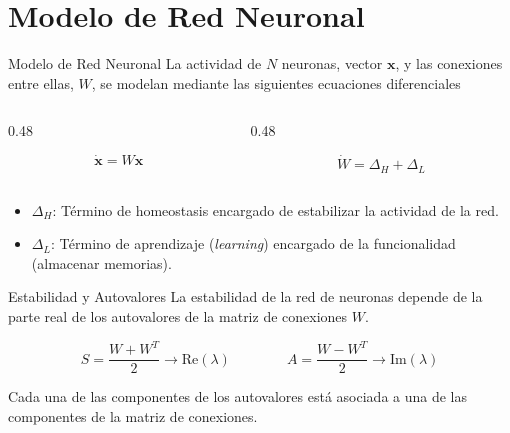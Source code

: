 \documentclass[10pt]{beamer}
\begin{document}
\section{Modelo de Red Neuronal}
\begin{frame}{Modelo de Red Neuronal}
    La actividad de \(N\) neuronas, vector \(\mathbf{x}\), y las conexiones entre ellas, \(W\), se modelan mediante las siguientes ecuaciones diferenciales 
    \vfill
    \begin{columns}[c]
        \begin{column}{0.48\textwidth}
            \begin{eqbox}
                \begin{equation}
                    \dot{\mathbf{x}} = W\mathbf{x}
                \end{equation}           
            \end{eqbox}

        \end{column}
        \begin{column}{0.48\textwidth}
            \begin{eqbox}
                \begin{equation}
                    \dot{W} = \Delta_H + \Delta_L
                \end{equation}        
            \end{eqbox}
        \end{column}
    \end{columns}
    \vfill
    \begin{itemize}
        \item \(\Delta_H\): Término de homeostasis encargado de estabilizar la actividad de la red.
        \item \(\Delta_L\): Término de aprendizaje (\emph{learning}) encargado de la funcionalidad (almacenar memorias).
    \end{itemize}
\end{frame}

\begin{frame}{Estabilidad y Autovalores}
    La estabilidad de la red de neuronas depende de la parte real de los autovalores de la matriz de conexiones \(W\).



    \begin{equation*}
        S = \frac{W + W^T}{2} \rightarrow \text{Re}(\lambda) \qquad \qquad A = \frac{W - W^T}{2} \rightarrow \text{Im}(\lambda)
    \end{equation*}

 Cada una de las componentes de los autovalores está asociada a una de las componentes de la matriz de conexiones.
\end{frame}
\end{document}
